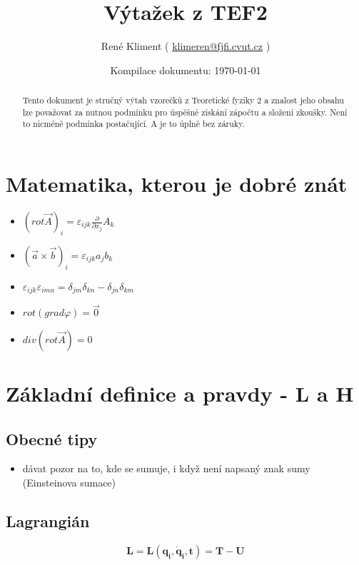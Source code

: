 \documentclass[a5paper,12pt]{article}
\author{
  René Kliment 
  ( \href{mailto:klimeren@fjfi.cvut.cz}{klimeren@fjfi.cvut.cz} )
}
\title{Výtažek z TEF2}
\date{Kompilace dokumentu: \today}
\begin{document}
\maketitle

\begin{abstract}
Tento dokument je stručný výtah vzorečků z Teoretické fyziky 2 a znalost jeho obsahu lze považovat za nutnou podmínku pro úspěšné získání zápočtu a složení zkoušky. Není to nicméně podmínka postačující. A je to úplně bez záruky.
\end{abstract}

\tableofcontents

\newpage

\section*{Matematika, kterou je dobré znát}

\begin{itemize}
 \item $(rot \vec{A})_i = \varepsilon_{ijk} \frac{\partial}{\partial x_j} A_k$
 \item $(\vec{a} \times \vec{b})_i = \varepsilon_{ijk} a_j b_k$
 \item $\varepsilon_{ijk}\varepsilon_{imn} = \delta_{jm}\delta_{kn} - \delta_{jn}\delta_{km}$
 \item $rot (grad \varphi) = \vec{0}$
 \item $div (rot \vec{A}) = 0$
\end{itemize}

\newpage

\section{Základní definice a pravdy - L a H}

\subsection*{Obecné tipy}
\begin{itemize}
 \item dávat pozor na to, kde se sumuje, i když není napsaný znak sumy (Einsteinova sumace)
\end{itemize}


\subsection{Lagrangián}

\begin{equation*}
	\boldsymbol{L=L(q_i, \dot{q}_i, t) = T - U}
\end{equation*}
\end{document}
